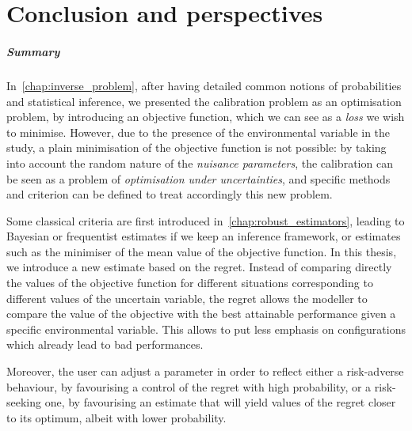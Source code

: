 \documentclass[../../Main_ManuscritThese.tex]{subfiles}
\begin{document}
\pagestyle{conclusionStyle}



\TitleBtwLines
\chapter*{Conclusion and perspectives}
{}
\label{chap:Conclusion}
\renewcommand{\thesection}{} %

\paragraph{Summary}
In~\cref{chap:inverse_problem}, after having detailed common notions
of probabilities and statistical inference, we presented the
calibration problem as an optimisation problem, by introducing an
objective function, which we can see as a \emph{loss} we wish to
minimise. However, due to the presence of the environmental variable
in the study, a plain minimisation of the objective function is not
possible: by taking into account the random nature of the
\emph{nuisance parameters}, the calibration can be seen as a problem
of \emph{optimisation under uncertainties}, and specific methods and
criterion can be defined to treat accordingly this new problem.


Some classical criteria are first introduced
in~\cref{chap:robust_estimators}, leading to Bayesian or frequentist
estimates if we keep an inference framework, or estimates such as the
minimiser of the mean value of the objective function. In this thesis,
we introduce a new estimate based on the regret. Instead of comparing
directly the values of the objective function for different situations
corresponding to different values of the uncertain variable, the
regret allows the modeller to compare the value of the objective with
the best attainable performance given a specific environmental
variable. This allows to put less emphasis on configurations which
already lead to bad performances.

Moreover, the user can adjust a
parameter in order to reflect either a risk-adverse behaviour, by
favourising a control of the regret with high probability, or a
risk-seeking one, by favourising an estimate that will yield values of
the regret closer to its optimum, albeit with lower probability.
\end{document}
